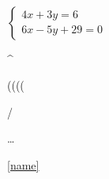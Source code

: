 \documentclass[12pt, a4paper, oneside]{report}	%
\begin{document}
\text{}

\begin{eqnarray}
\end{eqnarray}

$\begin{cases}
	4x + 3y = 6\\
	6x - 5y + 29= 0
\end{cases}$



\usepackage{amsfonts}
\usepackage{amssymb}


^\circ

\times

(\big (\Big (\bigg (\Bigg

\usepackage{textcomp}

\newcommand*{\No}{\textnumero}

\No

{\slash}

\ldots


\usepackage{hyperref}

\label{name}

\ref{name}

\makeatletter
\let\ref\@refstar
\makeatother


\usepackage{graphicx}


\usepackage{enumerate}
\end{document}
